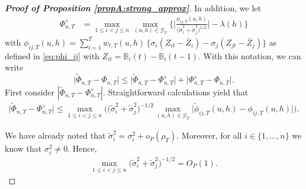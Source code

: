 \begin{proof}[\textnormal{\textbf{Proof of Proposition \ref{propA:strong_approx}}}]
In addition, we let
\begin{align*}
\Phi_{n, T}^{\diamond} & = \max_{1\leq i< j \leq n}\max_{(u,h) \in \mathcal{G}_T} \bigg\{ \bigg|\frac{\phi_{ij, T}(u,h)}{\big(\widetilde{\sigma}_i^2 + \widetilde{\sigma}_j^2 \big)^{1/2}}\bigg| - \lambda(h) \bigg\} 
\end{align*}
with $\phi_{ij,T}(u,h) = \sum\nolimits_{t=1}^T w_{t,T}(u,h) \, \big\{ \sigma_i (Z_{it} - \bar{Z}_i) - \sigma_j (Z_{jt} - \bar{Z}_j) \big\}
$ as defined in \eqref{eq:phi_ij} with $Z_{it} = \mathbb{B}_i(t) - \mathbb{B}_i(t-1)$. With this notation, we can write 
\begin{equation}\label{eq-strongapprox-bound1}
\big| \widetilde{\Phi}_{n, T} - \Phi_{n, T} \big| \le \big| \widetilde{\Phi}_{n, T} - \Phi_{n, T}^{\diamond} \big| + \big| \Phi_{n, T}^{\diamond} - \Phi_{n, T} \big|. 
\end{equation}
First consider $|\widetilde{\Phi}_{n, T} - \Phi_{n, T}^{\diamond}|$. Straightforward calculations yield that 
\begin{align}\label{eqA:strong_approx:bound2}
\big| \widetilde{\Phi}_{n, T} - \Phi_{n, T}^{\diamond} \big| \le  \max_{1\le i < j \le n} \Big(\big(\widetilde{\sigma}_i^2 + \widetilde{\sigma}_j^2 \big)^{-1/2} \max_{(u,h) \in \mathcal{G}_T} \big| \widetilde{\phi}_{ij, T}(u,h) - \phi_{ij, T}(u,h) \big|\Big).
\end{align}

We have already noted that $\widetilde{\sigma}_i^2 = \sigma_i^2 + o_P(\rho_T)$. Moreover, for all $i \in \{1, \ldots, n\}$ we know that $\sigma_i^2 \neq 0$. Hence, 
\begin{align}\label{eqA:strong_approx:bound3}
\max_{1\le i < j \le n}\big(\widetilde{\sigma}_i^2+ \widetilde{\sigma}_j^2 \big)^{-1/2}  = O_P(1).
\end{align}


\end{proof}
